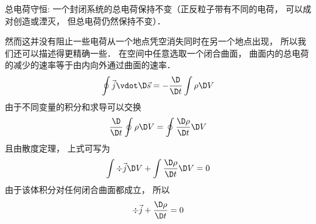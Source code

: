 
总电荷守恒: 一个封闭系统的总电荷保持不变（正反粒子带有不同的电荷， 可以成对创造或湮灭， 但总电荷仍然保持不变）．

然而这并没有阻止一些电荷从一个地点凭空消失同时在另一个地点出现， 所以我们还可以描述得更精确一些． 在空间中任意选取一个闭合曲面， 曲面内的总电荷的减少的速率等于由内向外通过曲面的速率．
\begin{equation}
\oint {\vec j \vdot \D \vec s}  =  - \frac{\D }{{\D t}}\int {\rho  \D V} 
\end{equation} 
由于不同变量的积分和求导可以交换
\begin{equation}
\frac{\D }{{\D t}}\oint {\rho  \D V}  = \oint {\frac{{\D \rho }}{{\D t}} \D V}
\end{equation}
且由散度定理， 上式可写为
\begin{equation}
\int {\div \vec j \D V}  + \int {\frac{{\D \rho }}{{\D t}}\D V}  = 0
\end{equation} 
由于该体积分对任何闭合曲面都成立， 所以
\begin{equation}
\div \vec j + \frac{{\D \rho }}{{\D t}} = 0
\end{equation} 